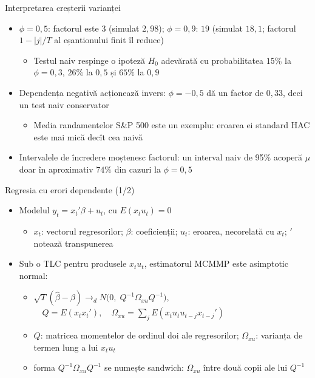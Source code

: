 \begin{frame}{Interpretarea creșterii varianței}
\itemsize{\small}
\begin{itemize}
    \item $\phi = 0{,}5$: factorul este $3$ (simulat $2{,}98$); $\phi = 0{,}9$: $19$ (simulat $18{,}1$; factorul $1 - |j|/T$ al eșantionului finit îl reduce)
    \begin{itemize}
        \item Testul naiv respinge o ipoteză $H_0$ adevărată cu probabilitatea $15\%$ la $\phi = 0{,}3$, $26\%$ la $0{,}5$ și $65\%$ la $0{,}9$
    \end{itemize}
    \item Dependența negativă acționează invers: $\phi = -0{,}5$ dă un factor de $0{,}33$, deci un test naiv conservator
    \begin{itemize}
        \item Media randamentelor S\&P 500 este un exemplu: eroarea ei standard HAC este mai mică decît cea naivă
    \end{itemize}
    \item Intervalele de încredere moștenesc factorul: un interval naiv de 95\% acoperă $\mu$ doar în aproximativ $74\%$ din cazuri la $\phi = 0{,}5$
\end{itemize}
\end{frame}

\begin{frame}{Regresia cu erori dependente (1/2)}
\itemsize{\small}
\begin{itemize}
    \item Modelul $y_t = x_t'\beta + u_t$, cu $E(x_t u_t) = 0$
    \begin{itemize}
        \item $x_t$: vectorul regresorilor; $\beta$: coeficienții; $u_t$: eroarea, necorelată cu $x_t$; $'$ notează transpunerea
    \end{itemize}
    \item Sub o TLC pentru produsele $x_t u_t$, estimatorul MCMMP este asimptotic normal:
    \begin{itemize}
        \item $\sqrt{T}(\hat\beta - \beta) \to_d N\big(0,\; Q^{-1}\Omega_{xu} Q^{-1}\big)$, $\quad Q = E(x_t x_t'),\quad \Omega_{xu} = \sum_{j}E(x_t u_t u_{t-j} x_{t-j}')$
        \item $Q$: matricea momentelor de ordinul doi ale regresorilor; $\Omega_{xu}$: varianța de termen lung a lui $x_t u_t$
        \item forma $Q^{-1}\Omega_{xu}Q^{-1}$ se numește sandwich: $\Omega_{xu}$ între două copii ale lui $Q^{-1}$
    \end{itemize}
\end{itemize}
\end{frame}

